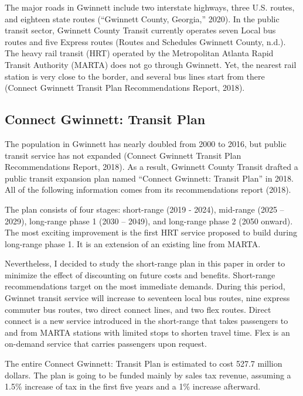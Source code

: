 \documentclass[
]{article}
\begin{document}
The major roads in Gwinnett include two interstate highways, three U.S.
routes, and eighteen state routes (``Gwinnett County, Georgia,'' 2020).
In the public transit sector, Gwinnett County Transit currently operates
seven Local bus routes and five Express routes (Routes and Schedules
\textbar{} Gwinnett County, n.d.). The heavy rail transit (HRT) operated
by the Metropolitan Atlanta Rapid Transit Authority (MARTA) does not go
through Gwinnett. Yet, the nearest rail station is very close to the
border, and several bus lines start from there (Connect Gwinnett Transit
Plan Recommendations Report, 2018).

\hypertarget{connect-gwinnett-transit-plan}{%
\subsection{Connect Gwinnett: Transit
Plan}\label{connect-gwinnett-transit-plan}}

The population in Gwinnett has nearly doubled from 2000 to 2016, but
public transit service has not expanded (Connect Gwinnett Transit Plan
Recommendations Report, 2018). As a result, Gwinnett County Transit
drafted a public transit expansion plan named ``Connect Gwinnett:
Transit Plan'' in 2018. All of the following information comes from its
recommendations report (2018).

The plan consists of four stages: short-range (2019 - 2024), mid-range
(2025 -- 2029), long-range phase 1 (2030 -- 2049), and long-range phase
2 (2050 onward). The most exciting improvement is the first HRT service
proposed to build during long-range phase 1. It is an extension of an
existing line from MARTA.

Nevertheless, I decided to study the short-range plan in this paper in
order to minimize the effect of discounting on future costs and
benefits. Short-range recommendations target on the most immediate
demands. During this period, Gwinnet transit service will increase to
seventeen local bus routes, nine express commuter bus routes, two direct
connect lines, and two flex routes. Direct connect is a new service
introduced in the short-range that takes passengers to and from MARTA
stations with limited stops to shorten travel time. Flex is an on-demand
service that carries passengers upon request.

The entire Connect Gwinnett: Transit Plan is estimated to cost 527.7
million dollars. The plan is going to be funded mainly by sales tax
revenue, assuming a 1.5\% increase of tax in the first five years and a
1\% increase afterward.
\end{document}
